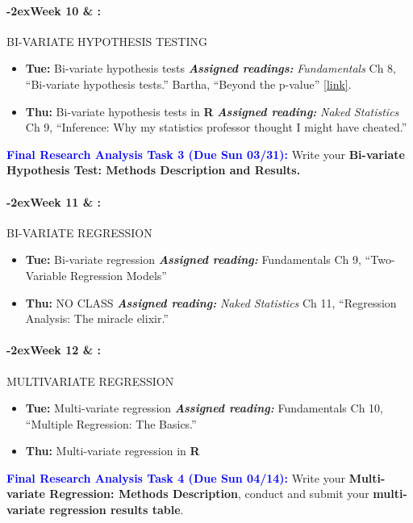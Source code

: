 \documentclass[11pt]{article}
\newcommand{\week}[1]{%
  \paragraph*{\kern-2ex\quad #1 \AdvanceDate[1]\syldate{\today} \& \AdvanceDate[2]\syldate{\today} :}%
  \ifdim\wd1=\wd\MONDAY
    \AdvanceDate[7]
  \else
    \AdvanceDate[7]
  \fi%
}
\begin{document}
\week{Week 10} BI-VARIATE HYPOTHESIS TESTING
\begin{itemize}
    \item [] \textbf{Tue:} Bi-variate hypothesis tests
    \subitem \textit{\textbf{Assigned readings:}} 
    \subsubitem \textit{Fundamentals} Ch 8, ``Bi-variate hypothesis tests.''
    \subsubitem Bartha, ``Beyond the p-value'' \href{https://medium.com/homeaway-tech-blog/beyond-the-p-value-223bfbb3072e}{[link]}.
    \item [] \textbf{Thu:} Bi-variate hypothesis tests in \textbf{\textsf{R}}
     \subitem \textbf{\textit{Assigned reading:}} \textit{Naked Statistics} Ch 9, ``Inference: Why my statistics professor thought\vspace{-5pt} \subitem I might have cheated.''
\end{itemize}

\noindent \textcolor{blue}{\textbf{Final Research Analysis Task 3 (Due Sun 03/31):}} Write your \textbf{Bi-variate Hypothesis Test: Methods Description and Results.}%

\week{Week 11} BI-VARIATE REGRESSION
\begin{itemize}
    \item [] \textbf{Tue:} Bi-variate regression
    \subitem \textbf{\textit{Assigned reading:}} Fundamentals Ch 9, ``Two-Variable Regression Models''
    \item [] \textbf{Thu:} NO CLASS
    \subitem \textbf{\textit{Assigned reading:}} \textit{Naked Statistics} Ch 11, ``Regression Analysis: The miracle elixir.''
\end{itemize}

\week{Week 12} MULTIVARIATE REGRESSION

\begin{itemize}
    \item [] \textbf{Tue:} Multi-variate regression
    \subitem \textbf{\textit{Assigned reading:}} Fundamentals Ch 10, ``Multiple Regression: The Basics.''
    
    \item [] \textbf{Thu:} Multi-variate regression in \textbf{\textsf{R}}
\end{itemize}

\noindent \textcolor{blue}{\textbf{Final Research Analysis Task 4 (Due Sun 04/14):}} Write your \textbf{Multi-variate Regression: Methods Description}, conduct and submit your \textbf{multi-variate regression results table}.%
\end{document}
